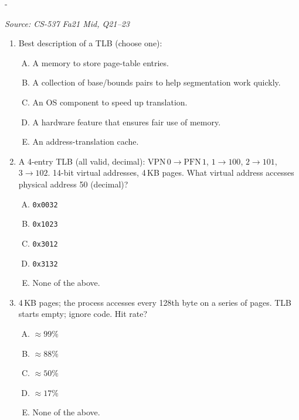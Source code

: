 \documentclass[11pt,a4paper]{article}
\makeatletter
\newcommand{\keepspace}[1]{\par\penalty-100\begingroup
  \setlength{\dimen@}{#1}\dimen@ii\pagegoal\advance\dimen@ii-\pagetotal
  \ifdim\dimen@>\dimen@ii\ifdim\dimen@ii>\z@\vfil\fi\break\fi\endgroup}
\newcounter{qn}[section]
\newenvironment{Qn}[4]{%
  \refstepcounter{qn}\keepspace{7\baselineskip}%
  \begin{tcolorbox}[qboxstyle, title={Q\thesection.\theqn\ \ [#1 \textbar\ #2]\ \ #4}]%
  {\footnotesize\color{g3}\textit{Source: #3}}\par\smallskip%
}{%
  \end{tcolorbox}%
}
\makeatother
\begin{document}
\begin{Qn}{Easy-Medium}{Lect 13}{CS-537 Fa21 Mid, Q21--23}{What a TLB is; reverse translation; strided hit rate}
\begin{enumerate}[(21)]
\item Best description of a TLB (choose one):
\begin{enumerate}[(A)]
\item A memory to store page-table entries.
\item A collection of base/bounds pairs to help segmentation work quickly.
\item An OS component to speed up translation.
\item A hardware feature that ensures fair use of memory.
\item An address-translation cache.
\end{enumerate}
\item A 4-entry TLB (all valid, decimal):
      $\mathrm{VPN}\,0\to\mathrm{PFN}\,1$,
      $1\to 100$, $2\to 101$, $3\to 102$.
      14-bit virtual addresses, 4\,KB pages. What virtual address
      accesses physical address 50 (decimal)?
\begin{enumerate}[(A)]
\item \texttt{0x0032}
\item \texttt{0x1023}
\item \texttt{0x3012}
\item \texttt{0x3132}
\item None of the above.
\end{enumerate}
\item 4\,KB pages; the process accesses every 128th byte on a series of
      pages. TLB starts empty; ignore code. Hit rate?
\begin{enumerate}[(A)]
\item $\approx 99\%$
\item $\approx 88\%$
\item $\approx 50\%$
\item $\approx 17\%$
\item None of the above.
\end{enumerate}
\end{enumerate}
\end{Qn}
\end{document}
